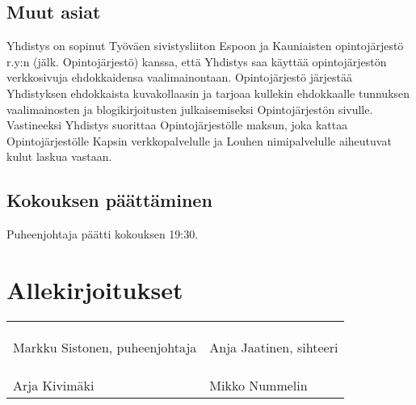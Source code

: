 \documentclass[a4paper,12pt]{article}
\begin{document}
\subsection{Muut asiat}
Yhdistys on sopinut Työväen sivistysliiton Espoon ja Kauniaisten opintojärjestö r.y:n (jälk. Opintojärjestö) kanssa, että Yhdistys saa käyttää opintojärjestön verkkosivuja ehdokkaidensa vaalimainontaan. Opintojärjestö järjestää Yhdistyksen ehdokkaista kuvakollaasin ja tarjoaa kullekin ehdokkaalle tunnuksen vaalimainosten ja blogikirjoitusten julkaisemiseksi Opintojärjestön sivulle. Vastineeksi Yhdistys suorittaa Opintojärjestölle maksun, joka kattaa Opintojärjestölle Kapsin verkkopalvelulle ja Louhen nimipalvelulle aiheutuvat kulut laskua vastaan.
\subsection{Kokouksen päättäminen}
Puheenjohtaja päätti kokouksen 19:30.
\section*{Allekirjoitukset}
\begin{flushleft}
\begin{tabular}{ll}
& \\
& \\
& \\
Markku Sistonen, puheenjohtaja &
Anja Jaatinen, sihteeri \\
& \\
& \\
& \\
Arja Kivimäki &
Mikko Nummelin
\end{tabular}
\end{flushleft}
\end{document}
